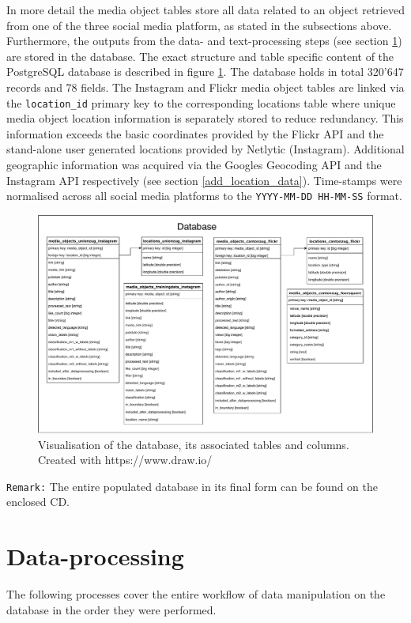 In more detail the media object tables store all data related to an object retrieved from one of the three social media platform, as stated in the subsections above. Furthermore, the outputs from the data- and text-processing steps (see section \ref{data_processing}) are stored in the database. The exact structure and table specific content of the PostgreSQL database is described in figure \ref{fig:database}. The database holds in total 320'647 records and 78 fields. The Instagram and Flickr media object tables are linked via the \texttt{location\_id} primary key to the corresponding locations table where unique media object location information is separately stored to reduce redundancy. This information exceeds the basic coordinates provided by the Flickr API and the stand-alone user generated locations provided by Netlytic (Instagram). Additional geographic information was acquired via the Googles Geocoding API and the Instagram API respectively (see section \ref{add_location_data}). Time-stamps were normalised across all social media platforms to the \texttt{YYYY-MM-DD HH-MM-SS} format.

\begin{figure}[h]
   \centering
   \includegraphics[width=\textwidth]{img/fusion_db_overview}
   \caption{Visualisation of the database, its associated tables and columns. \\ Created with https://www.draw.io/}
   \label{fig:database}
\end{figure}

\texttt{Remark:} The entire populated database in its final form can be found on the enclosed CD.

\section{Data-processing} \label{data_processing}
The following processes cover the entire workflow of data manipulation on the database in the order they were performed.
